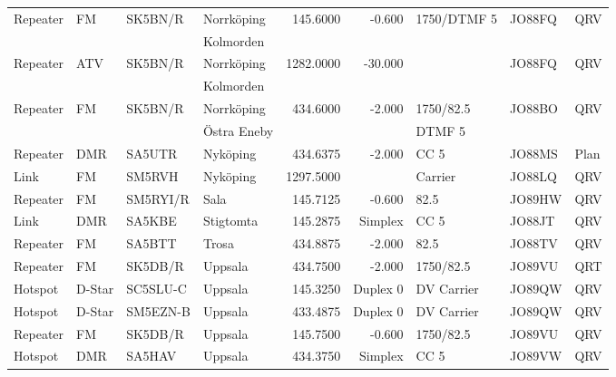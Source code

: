 \begin{longtable}{llllrrlll}
Repeater & FM         & SK5BN/R  & Norrköping        & 145.6000     & -0.600     & 1750/DTMF 5     & JO88FQ      & QRV      \\
         &            &          & Kolmorden         &              &            &                 &             &          \\
Repeater & ATV        & SK5BN/R  & Norrköping        & 1282.0000    & -30.000    &                 & JO88FQ      & QRV      \\
         &            &          & Kolmorden         &              &            &                 &             &          \\
Repeater & FM         & SK5BN/R  & Norrköping        & 434.6000     & -2.000     & 1750/82.5       & JO88BO      & QRV      \\
         &            &          & Östra Eneby       &              &            & DTMF 5          &             &          \\
Repeater & DMR        & SA5UTR   & Nyköping          & 434.6375     & -2.000     & CC 5            & JO88MS      & Plan     \\
Link     & FM         & SM5RVH   & Nyköping          & 1297.5000    &            & Carrier         & JO88LQ      & QRV      \\
Repeater & FM         & SM5RYI/R & Sala              & 145.7125     & -0.600     & 82.5            & JO89HW      & QRV      \\
Link     & DMR        & SA5KBE   & Stigtomta         & 145.2875     & Simplex    & CC 5            & JO88JT      & QRV      \\
Repeater & FM         & SA5BTT   & Trosa             & 434.8875     & -2.000     & 82.5            & JO88TV      & QRV      \\
Repeater & FM         & SK5DB/R  & Uppsala           & 434.7500     & -2.000     & 1750/82.5       & JO89VU      & QRT      \\
Hotspot  & D-Star     & SC5SLU-C & Uppsala           & 145.3250     & Duplex 0   & DV Carrier      & JO89QW      & QRV      \\
Hotspot  & D-Star     & SM5EZN-B & Uppsala           & 433.4875     & Duplex 0   & DV Carrier      & JO89QW      & QRV      \\
Repeater & FM         & SK5DB/R  & Uppsala           & 145.7500     & -0.600     & 1750/82.5       & JO89VU      & QRV      \\
Hotspot  & DMR        & SA5HAV   & Uppsala           & 434.3750     & Simplex    & CC 5            & JO89VW      & QRV      \\

\end{longtable}
